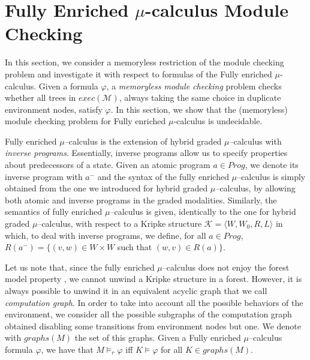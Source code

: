 \documentclass{LMCS}
\theoremstyle{plain}
\def \K             {\mathcal{K}}
\def \M             {\mathcal{M}}
\newcommand \tpl[1] {\langle #1 \rangle}
\begin{document}
\section{Fully Enriched $\mu$-calculus Module Checking}\label{sec:FullyEnrichedModuleChecking}
In this section, we consider a memoryless restriction of the
module checking problem and investigate it with respect to
formulas of the Fully enriched $\mu$-calculus. Given a formula
$\varphi$, a \emph{memoryless module checking} problem checks
whether all trees in $exec(\M)$, always taking the same choice in
duplicate environment nodes, satisfy $\varphi$. In this section,
we show that the (memoryless) module checking problem for Fully
enriched $\mu$-calculus is undecidable.

Fully enriched $\mu$--calculus is the extension of hybrid graded
$\mu$--calculus with \emph{inverse programs}. Essentially, inverse
programs allow us to specify properties about predecessors of a
state. Given an atomic program $a \in Prog$, we denote its inverse
program with $a^-$ and the syntax of the fully enriched
$\mu$--calculus is simply obtained from the one we introduced for
hybrid graded $\mu$--calculus, by allowing both atomic and inverse
programs in the graded modalities. Similarly, the semantics of
fully enriched $\mu$--calculus is given, identically to the one
for hybrid graded $\mu$--calculus, with respect to a Kripke
structure $\K = \tpl{W, W_0, R, L}$ in which, to deal with inverse
programs, we define, for all $a \in Prog$, $R(a^-) = \{(v,w) \in W
\times W$ such that $(w,v) \in R(a)\}$.

Let us note that, since the fully enriched $\mu$--calculus does
not enjoy the forest model property \cite{BP04}, we cannot unwind
a Kripke structure in a forest. However, it is always possible to
unwind it in an equivalent acyclic graph that we call
\emph{computation graph}. In order to take into account all the
possible behaviors of the environment, we consider all the
possible subgraphs of the computation graph obtained disabling
some transitions from environment nodes but one. We denote with
$graphs(M)$ the set of this graphs. Given a Fully enriched
$\mu$--calculus formula $\varphi$, we have that $M \models_r
\varphi$ iff $K \models \varphi$ for all $K \in graphs(M)$.
\end{document}
